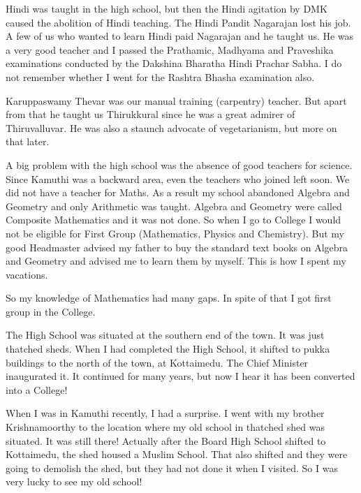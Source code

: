 Hindi was taught in the high school, but then the Hindi agitation by DMK 
caused the abolition of Hindi teaching. The Hindi Pandit Nagarajan lost 
his job. A few of us who wanted to learn Hindi paid Nagarajan and he 
taught us. He was a very good tea\-cher and I passed the Prathamic, 
Madhyama and Praveshika exa\-minations conducted by the Dakshina Bharatha 
Hindi Prachar Sabha. I do not remember whether I went for the Rashtra 
Bhasha examination also.

Karuppaswamy Thevar was our manual training (carpentry) teacher. But 
apart from that he taught us Thirukkural since he was a great admirer of 
Thiruvalluvar. He was also a staunch advoca\-te of vegetarianism, but more 
on that later.
 
A big problem with the high school was the absence of good teachers for 
science. Since Kamuthi was a backward area, even the teachers who joined 
left soon. We did not have a teacher for Maths. As a result my school 
abandoned Algebra and Geometry and only Arithmetic was taught. Algebra 
and Geometry were called Composite Mathematics and it was not done. So 
when I go to College I would not be eligible for First Group 
(Mathematics, Physics and Chemistry). But my good Headmaster advised my 
father to buy the standard text books on Algebra and Geometry and 
advised me to learn them by myself. This is how I spent my vacations.

So my knowledge of Mathematics had many gaps. In spite of that I got 
first group in the College.

The High School was situated at the southern end of the town. It was 
just thatched sheds. When I had completed the High Sch\-ool, it shifted to 
pukka buildings to the north of the town, at Kottaimedu. The Chief 
Minister inaugurated it. It continued for many years, but now I hear it 
has been converted into a College!

When I was in Kamuthi recently, I had a surprise. I went with my brother 
Krishnamoorthy to the location where my old school in thatched shed was 
situated. It was still there! Actually after the Board High School 
shifted to Kottaimedu, the shed housed a Muslim School. That also 
shifted and they were going to demo\-lish the shed, but they had not done 
it when I visited. So I was very lucky to see my old school!

